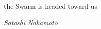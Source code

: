 \vspace*{100mm} 
\begin{displayquote}{

\large{the Swarm is headed toward us}
}

\textit{Satoshi Nakamoto}
\end{displayquote}

\newpage
